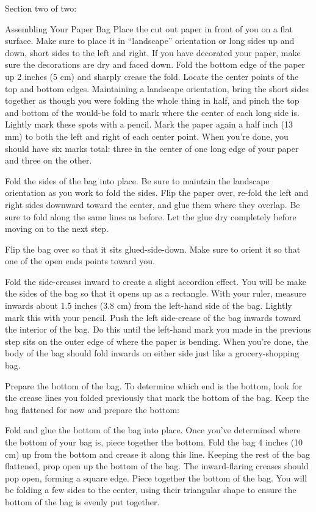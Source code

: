 \documentclass[12pt,letterpaper]{article}
\begin{document}
Section two of two: 

Assembling Your Paper Bag
Place the cut out paper in front of you on a flat surface. Make sure to place it in “landscape” orientation or long sides up and down, short sides to the left and right. If you have decorated your paper, make sure the decorations are dry and faced down. Fold the bottom edge of the paper up 2 inches (5 cm) and sharply crease the fold.  Locate the center points of the top and bottom edges. Maintaining a landscape orientation, bring the short sides together as though you were folding the whole thing in half, and pinch the top and bottom of the would-be fold to mark where the center of each long side is. Lightly mark these spots with a pencil.
Mark the paper again a half inch (13 mm) to both the left and right of each center point. When you’re done, you should have six marks total: three in the center of one long edge of your paper and three on the other.

    Fold the sides of the bag into place. Be sure to maintain the landscape orientation as you work to fold the sides. Flip the paper over, re-fold the left and right sides downward toward the center, and glue them where they overlap. Be sure to fold along the same lines as before. Let the glue dry completely before moving on to the next step.
    
    Flip the bag over so that it sits glued-side-down. Make sure to orient it so that one of the open ends points toward you.
    
    Fold the side-creases inward to create a slight accordion effect. You will be make the sides of the bag so that it opens up as a rectangle. With your ruler, measure inwards about 1.5 inches (3.8 cm) from the left-hand side of the bag. Lightly mark this with your pencil. Push the left side-crease of the bag inwards toward the interior of the bag. Do this until the left-hand mark you made in the previous step sits on the outer edge of where the paper is bending. When you’re done, the body of the bag should fold inwards on either side just like a grocery-shopping bag.

    Prepare the bottom of the bag. To determine which end is the bottom, look for the crease lines you folded previously that mark the bottom of the bag. Keep the bag flattened for now and prepare the bottom:
    
    Fold and glue the bottom of the bag into place. Once you've determined where the bottom of your bag is, piece together the bottom. Fold the bag 4 inches (10 cm) up from the bottom and crease it along this line. Keeping the rest of the bag flattened, prop open up the bottom of the bag. The inward-flaring creases should pop open, forming a square edge. Piece together the bottom of the bag. You will be folding a few sides to the center, using their triangular shape to ensure the bottom of the bag is evenly put together.
    
\end{document}
